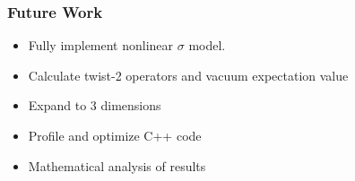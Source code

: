 \documentclass{beamer}
\begin{document}
\begin{frame}
\frametitle{Future Work}
\begin{itemize}
    \item Fully implement nonlinear $\sigma$ model.
    \item Calculate twist-2 operators and vacuum expectation value
    \item Expand to 3 dimensions
    \item Profile and optimize C++ code
    \item Mathematical analysis of results
\end{itemize}

\end{frame}







\end{document}
